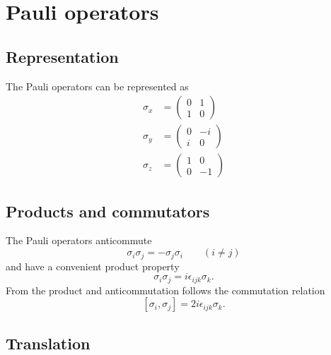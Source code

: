 \section{Pauli operators}

\subsection{Representation}
The Pauli operators can be represented as \begin{align}
  \sigma_x &= \left( \begin{array}{cc} 0 & 1 \\ 1 & 0 \end{array} \right) \nonumber \\
  \sigma_y &= \left( \begin{array}{cc} 0 & -i \\ i & 0 \end{array} \right) \nonumber \\
  \sigma_z &= \left( \begin{array}{cc} 1 & 0 \\ 0 & -1 \end{array} \right)
\end{align}

\subsection{Products and commutators}
The Pauli operators anticommute \begin{equation}
\sigma_i \sigma_j = - \sigma_j \sigma_i \qquad (i \neq j) \end{equation}
and have a convenient product property \begin{equation}
\sigma_i \sigma_j = i \epsilon_{ijk} \sigma_k. \end{equation}
From the product and anticommutation follows the commutation relation \begin{equation}
\left[ \sigma_i, \sigma_j \right] = 2i \epsilon_{ijk} \sigma_k. \end{equation}

\subsection{Translation}

